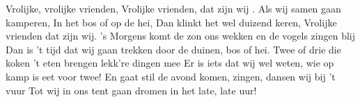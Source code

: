 \beginchorus
Vrolijke, vrolijke vrienden,
Vrolijke vrienden, dat zijn wij .
\endchorus
\beginverse*
Als wij samen gaan kamperen,
In het bos of op de hei,
Dan klinkt het wel duizend keren,
Vrolijke vrienden dat zijn wij. 
\endverse
\beginverse*
's Morgens komt de zon ons wekken
en de vogels zingen blij
Dan is 't tijd dat wij gaan trekken
door de duinen, bos of hei. 
\endverse
\beginverse*
Twee of drie die koken 't eten
brengen lekk're dingen mee
Er is iets dat wij wel weten,
wie op kamp is eet voor twee! 
\endverse
\beginverse*
En gaat stil de avond komen,
zingen, dansen wij bij 't vuur
Tot wij in ons tent gaan dromen
in het late, late uur!
\endverse
\endsong